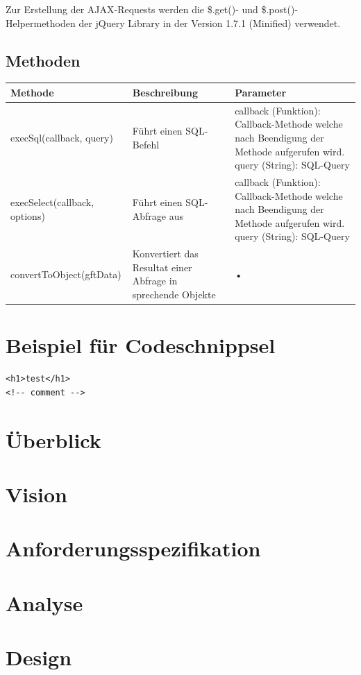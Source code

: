 Zur Erstellung der AJAX-Requests werden die \$.get()- und \$.post()-Helpermethoden der jQuery Library in der Version 1.7.1 (Minified) verwendet.

\subsection{Methoden}
\begin{tabular}{|l|l|l|}
\hline 
Methode & Beschreibung & Parameter \\ 
\hline 
execSql(callback, query) & Führt einen SQL-Befehl & callback (Funktion): Callback-Methode welche nach Beendigung der Methode aufgerufen wird. query (String): SQL-Query \\ 
\hline 
execSelect(callback, options) & Führt einen SQL-Abfrage aus & callback (Funktion): Callback-Methode welche nach Beendigung der Methode aufgerufen wird. query (String): SQL-Query \\ 
\hline 
convertToObject(gftData) & Konvertiert das Resultat einer Abfrage in sprechende Objekte & • \\ 
\hline 
\end{tabular} 



\section*{Beispiel für Codeschnippsel}
\lstset{language=HTML}
\begin{lstlisting}
<h1>test</h1>
<!-- comment -->
\end{lstlisting}

\section{Überblick}

\section{Vision}

\section{Anforderungsspezifikation}

\section{Analyse}

\section{Design}

